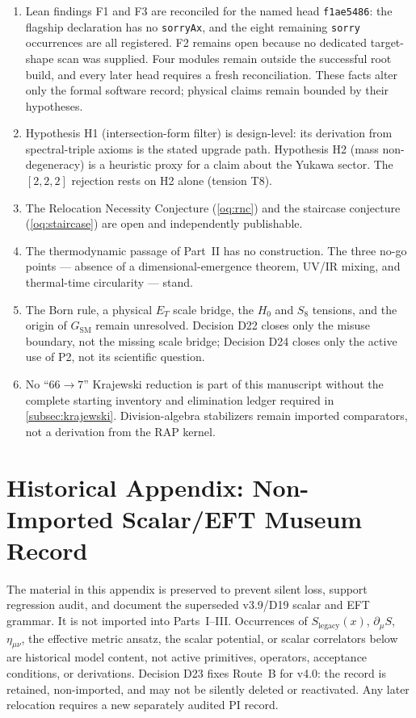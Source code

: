 \documentclass[12pt,a4paper,twoside]{article}
\theoremstyle{plain}
\theoremstyle{definition}
\theoremstyle{remark}
\newcommand{\LegacySx}{S_{\mathrm{legacy}}(x)} %
\begin{document}
\begin{enumerate}[leftmargin=1.6em,itemsep=0.25em]
\item Lean findings F1 and F3 are reconciled for the named head
\texttt{f1ae5486}: the flagship declaration has no \texttt{sorryAx}, and the
eight remaining \texttt{sorry} occurrences are all registered. F2 remains
open because no dedicated target-shape scan was supplied. Four modules remain
outside the successful root build, and every later head requires a fresh
reconciliation. These facts alter only the formal software record; physical
claims remain bounded by their hypotheses.
\item Hypothesis H1 (intersection-form filter) is design-level: its
derivation from spectral-triple axioms is the stated upgrade path.
Hypothesis H2 (mass non-degeneracy) is a heuristic proxy for a claim
about the Yukawa sector. The $[2,2,2]$ rejection rests on H2 alone
(tension T8).
\item The Relocation Necessity Conjecture (\cref{oq:rnc}) and the
staircase conjecture (\cref{oq:staircase}) are open and independently
publishable.
\item The thermodynamic passage of Part~II has no construction. The
three no-go points --- absence of a dimensional-emergence theorem,
UV/IR mixing, and thermal-time circularity --- stand.
\item The Born rule, a physical $E_T$ scale bridge, the $H_0$ and $S_8$
tensions, and the origin of $G_{\mathrm{SM}}$ remain unresolved. Decision
D22 closes only the misuse boundary, not the missing scale bridge; Decision
D24 closes only the active use of P2, not its scientific question.
\item No ``$66\to7$'' Krajewski reduction is part of this manuscript
without the complete starting inventory and elimination ledger required in
\cref{subsec:krajewski}. Division-algebra stabilizers remain imported
comparators, not a derivation from the RAP kernel.
\end{enumerate}


\clearpage
\appendix
\toggletrue{museumwatermark}
\part*{Historical Appendix: Non-Imported Scalar/EFT Museum Record}

\begin{governancebox}
The material in this appendix is preserved to prevent silent loss, support
regression audit, and document the superseded v3.9/D19 scalar and EFT grammar.
It is not imported into Parts~I--III. Occurrences of
$\LegacySx$, $\partial_\mu S$, $\eta_{\mu\nu}$, the effective metric ansatz,
the scalar potential, or scalar correlators below are historical model content,
not active primitives, operators, acceptance conditions, or derivations.
Decision D23 fixes Route~B for v4.0: the record is retained, non-imported, and
may not be silently deleted or reactivated. Any later relocation requires a
new separately audited PI record.
\end{governancebox}
\end{document}
